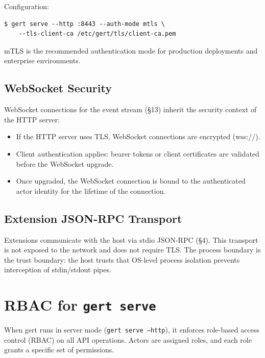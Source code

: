 Configuration:

\begin{verbatim}
$ gert serve --http :8443 --auth-mode mtls \
    --tls-client-ca /etc/gert/tls/client-ca.pem
\end{verbatim}

mTLS is the recommended authentication mode for production deployments and
enterprise environments.

\subsection{WebSocket Security}

WebSocket connections for the event stream (§13) inherit the security context
of the HTTP server:

\begin{itemize}
  \item If the HTTP server uses TLS, WebSocket connections are encrypted
        (wss://).
  \item Client authentication applies: bearer tokens or client certificates are
        validated before the WebSocket upgrade.
  \item Once upgraded, the WebSocket connection is bound to the authenticated
        actor identity for the lifetime of the connection.
\end{itemize}

\subsection{Extension JSON-RPC Transport}

Extensions communicate with the host via stdio JSON-RPC (§4).  This transport
is not exposed to the network and does not require TLS.  The process boundary
is the trust boundary: the host trusts that OS-level process isolation prevents
interception of stdin/stdout pipes.

\section{RBAC for \texttt{gert serve}}
\label{sec:rbac}

When gert runs in server mode (\texttt{gert serve --http}), it enforces
role-based access control (RBAC) on all API operations.  Actors are assigned
roles, and each role grants a specific set of permissions.

